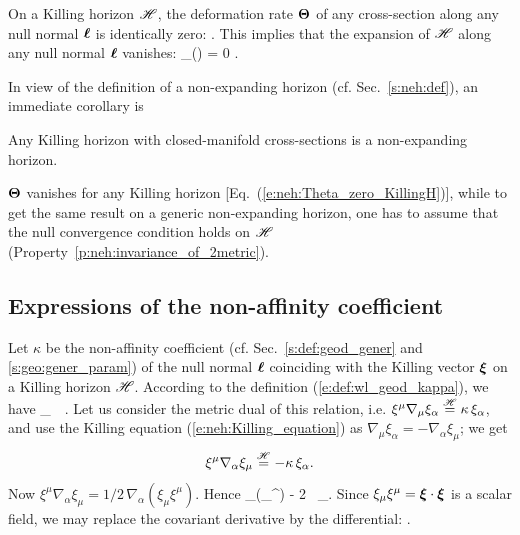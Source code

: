 \begin{prop}
On a Killing horizon $\mathscr{H}$,
the deformation rate $\bm{\Theta}$ of any cross-section along any null normal $\bm{\ell}$
is identically zero:
\be \label{e:neh:Theta_zero_KillingH}
   .
\ee
This implies that the expansion of $\mathscr{H}$ along any null normal $\bm{\ell}$ vanishes:
\be
    \theta_{(\wl)} = 0 .
\ee
\end{prop}
In view of the definition of a non-expanding horizon (cf. Sec.~\ref{s:neh:def}),
an immediate corollary is
\begin{prop}
Any Killing horizon with closed-manifold cross-sections is a non-expanding horizon.
\end{prop}

\begin{remark}
$\bm{\Theta}$ vanishes for any Killing horizon [Eq.~(\ref{e:neh:Theta_zero_KillingH})], while to get the same result on a generic non-expanding horizon, one has to assume that the null convergence condition holds on $\mathscr{H}$
(Property~\ref{p:neh:invariance_of_2metric}).
\end{remark}

\subsection{Expressions of the non-affinity coefficient}

Let $\kappa$ be the non-affinity coefficient
(cf. Sec.~\ref{s:def:geod_gener} and \ref{s:geo:gener_param})
of the null normal $\bm{\ell}$ coinciding with the Killing vector $\bm{\xi}$
on a Killing horizon $\mathscr{H}$. According to the definition
(\ref{e:def:wl_geod_kappa}), we have
\be \label{e:neh:xi_nab_xi_kappa}
    \wnab_{\w{\xi}}\, \w{\xi} \equalH \kappa \, \w{\xi} .
\ee
Let us consider the metric dual of this relation, i.e.
$\xi^\mu \nabla_\mu \xi_\alpha \stackrel{\mathscr{H}}{=} \kappa \, \xi_\alpha$,
and use the Killing equation (\ref{e:neh:Killing_equation}) as
$\nabla_\mu \xi_\alpha = - \nabla_\alpha \xi_\mu$; we get
\[
    \xi^\mu \nabla_\alpha \xi_\mu \stackrel{\mathscr{H}}{=} - \kappa \, \xi_\alpha .
\]
Now $\xi^\mu \nabla_\alpha \xi_\mu = 1/2 \, \nabla_\alpha (\xi_\mu \xi^\mu)$.
Hence
\be
    \nabla_\alpha (\xi_\mu \xi^\mu) \equalH - 2 \kappa \, \xi_\alpha.
\ee
Since $\xi_\mu \xi^\mu = \bm{\xi}\cdot\bm{\xi}$ is a scalar field, we may
replace the covariant derivative by the differential:
\be \label{e:neh:dxi2_kappa}
    \encadre{ \dd (\w{\xi}\cdot\w{\xi}) \equalH - 2 \kappa \, \uu{\xi} } .
\ee

